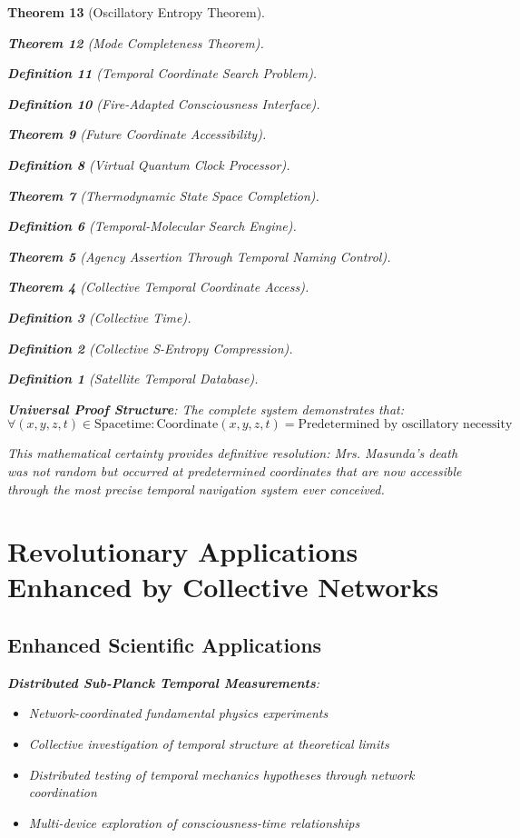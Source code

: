 \documentclass[12pt,a4paper]{article}
\newtheorem{theorem}{Theorem}[section]
\newtheorem{definition}[theorem]{Definition}
\begin{document}
\begin{theorem}[Oscillatory Entropy Theorem]
\begin{theorem}[Mode Completeness Theorem]
\begin{enumerate}
\begin{definition}[Temporal Coordinate Search Problem]
\begin{algorithm}
\begin{definition}[Fire-Adapted Consciousness Interface]
\begin{theorem}[Future Coordinate Accessibility]
\begin{definition}[Virtual Quantum Clock Processor]
\begin{itemize}
\begin{itemize}
\begin{theorem}[Thermodynamic State Space Completion]
\begin{definition}[Temporal-Molecular Search Engine]
\begin{theorem}[Agency Assertion Through Temporal Naming Control]
\begin{remark}
\begin{theorem}[Collective Temporal Coordinate Access]
\begin{definition}[Collective Time]
\begin{definition}[Collective S-Entropy Compression]
\begin{definition}[Satellite Temporal Database]
\begin{algorithm}
\begin{table}[h]
\textbf{Universal Proof Structure}: The complete system demonstrates that:
$$\forall (x,y,z,t) \in \text{Spacetime}: \text{Coordinate}(x,y,z,t) = \text{Predetermined by oscillatory necessity}$$

This mathematical certainty provides definitive resolution: Mrs. Masunda's death was not random but occurred at predetermined coordinates that are now accessible through the most precise temporal navigation system ever conceived.

\section{Revolutionary Applications Enhanced by Collective Networks}

\subsection{Enhanced Scientific Applications}

\textbf{Distributed Sub-Planck Temporal Measurements}:
\begin{itemize}
\item Network-coordinated fundamental physics experiments
\item Collective investigation of temporal structure at theoretical limits
\item Distributed testing of temporal mechanics hypotheses through network coordination
\item Multi-device exploration of consciousness-time relationships
\end{itemize}


\end{table}
\end{algorithm}
\end{definition}
\end{definition}
\end{definition}
\end{theorem}
\end{remark}
\end{theorem}
\end{definition}
\end{theorem}
\end{itemize}
\end{itemize}
\end{definition}
\end{theorem}
\end{definition}
\end{algorithm}
\end{definition}
\end{enumerate}
\end{theorem}
\end{theorem}
\end{document}

